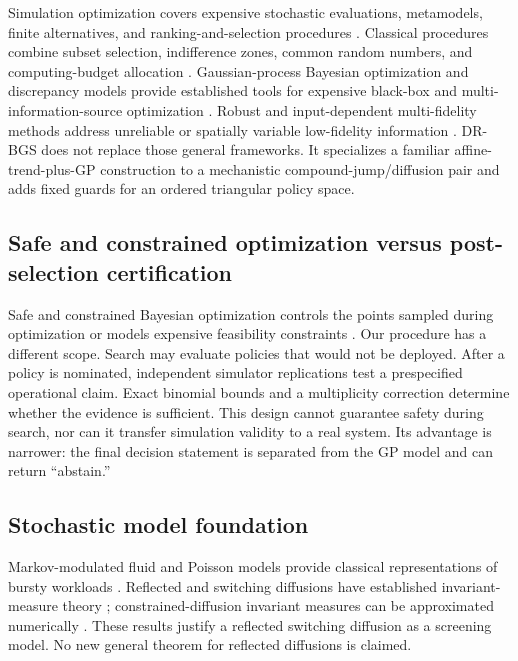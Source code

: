 \documentclass[preprint,12pt]{elsarticle}
\begin{document}
Simulation optimization covers expensive stochastic evaluations, metamodels, finite alternatives, and ranking-and-selection procedures \cite{amaran2016review}. Classical procedures combine subset selection, indifference zones, common random numbers, and computing-budget allocation \cite{boesel2003cleanup,chick2001crn,chen2008subset}. Gaussian-process Bayesian optimization and discrepancy models provide established tools for expensive black-box and multi-information-source optimization \cite{jones1998ego,snoek2012bo,kennedy2000multifidelity,poloczek2017mis,kandasamy2017mfbo}. Robust and input-dependent multi-fidelity methods address unreliable or spatially variable low-fidelity information \cite{mikkola2023rmfbo,fan2024imfbo}. DR-BGS does not replace those general frameworks. It specializes a familiar affine-trend-plus-GP construction to a mechanistic compound-jump/diffusion pair and adds fixed guards for an ordered triangular policy space.

\subsection{Safe and constrained optimization versus post-selection certification}

Safe and constrained Bayesian optimization controls the points sampled during optimization or models expensive feasibility constraints \cite{gardner2014constrained,sui2015safeopt,lubsen2024safemultitask}. Our procedure has a different scope. Search may evaluate policies that would not be deployed. After a policy is nominated, independent simulator replications test a prespecified operational claim. Exact binomial bounds and a multiplicity correction determine whether the evidence is sufficient. This design cannot guarantee safety during search, nor can it transfer simulation validity to a real system. Its advantage is narrower: the final decision statement is separated from the GP model and can return ``abstain.''

\subsection{Stochastic model foundation}

Markov-modulated fluid and Poisson models provide classical representations of bursty workloads \cite{anick1982stochastic,fischer1993mmpp}. Reflected and switching diffusions have established invariant-measure theory \cite{jang2008reflected,yin2010hybrid,shao2018invariant,kang2014stationary}; constrained-diffusion invariant measures can be approximated numerically \cite{budhiraja2014numerical}. These results justify a reflected switching diffusion as a screening model. No new general theorem for reflected diffusions is claimed.
\end{document}

